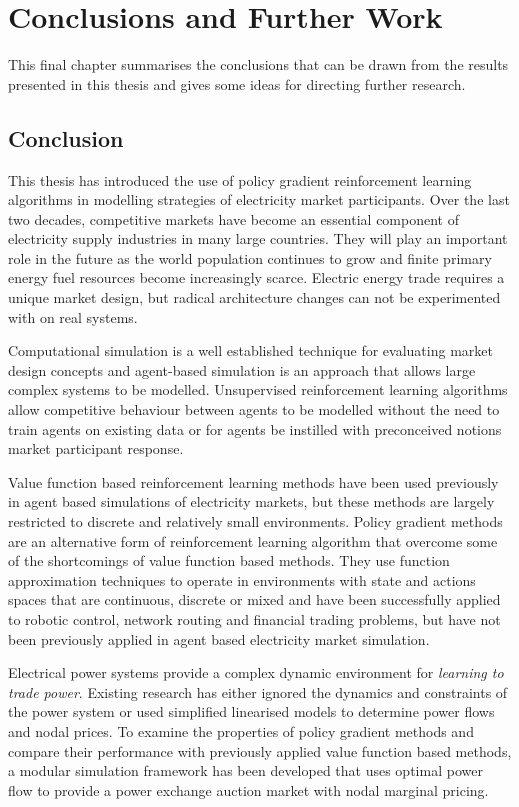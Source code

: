 \chapter{Conclusions and Further Work}
\label{ch:conclusion}
This final chapter summarises the conclusions that can be drawn from the
results presented in this thesis and gives some ideas for directing further
research.

\section{Conclusion}
This thesis has introduced the use of policy gradient reinforcement learning
algorithms in modelling strategies of electricity market participants. Over
the last two decades, competitive markets have become an essential component of
electricity supply industries in many large countries.  They will play an
important role in the future as the world population continues to grow and
finite primary energy fuel resources become increasingly scarce.  Electric
energy trade requires a unique market design, but radical architecture changes
can not be experimented with on real systems.

Computational simulation is a well established technique for evaluating market
design concepts and agent-based simulation is an approach that allows large
complex systems to be modelled.  Unsupervised reinforcement learning algorithms
allow competitive behaviour between agents to be modelled without the need to
train agents on existing data or for agents be instilled with preconceived
notions market participant response.

Value function based reinforcement learning methods have been used previously in
agent based simulations of electricity markets, but these methods are largely
restricted to discrete and relatively small environments.  Policy gradient
methods are an alternative form of reinforcement learning algorithm that
overcome some of the shortcomings of value function based methods. They use
function approximation techniques to operate in environments with state and
actions spaces that are continuous, discrete or mixed and have been successfully
applied to robotic control, network routing and financial trading problems, but
have not been previously applied in agent based electricity market simulation.

Electrical power systems provide a complex dynamic environment for
\textit{learning to trade power}.  Existing research has either ignored the
dynamics and constraints of the power system or used simplified linearised
models to determine power flows and nodal prices.  To examine the properties of
policy gradient methods and compare their performance with previously applied
value function based methods, a modular simulation framework has been developed
that uses optimal power flow to provide a power exchange auction market with
nodal marginal pricing.

